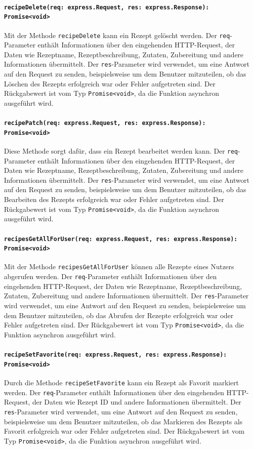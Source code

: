\documentclass{entwurfsheft}
\begin{document}
\paragraph{\texttt{recipeDelete(req: express.Request, res: express.Response): Promise<void>}}
Mit der Methode \texttt{recipeDelete} kann ein Rezept gelöscht werden. Der \texttt{req}-Parameter enthält Informationen über den eingehenden HTTP-Request, der Daten wie Rezeptname, Rezeptbeschreibung, Zutaten, Zubereitung und andere Informationen übermittelt. Der \texttt{res}-Parameter wird verwendet, um eine Antwort auf den Request zu senden, beispielsweise um dem Benutzer mitzuteilen, ob das Löschen des Rezepts erfolgreich war oder Fehler aufgetreten sind.
Der Rückgabewert ist vom Typ \texttt{Promise<void>}, da die Funktion asynchron ausgeführt wird.
\paragraph{\texttt{recipePatch(req: express.Request, res: express.Response): Promise<void>}}
Diese Methode sorgt dafür, dass ein Rezept bearbeitet werden kann. Der \texttt{req}-Parameter enthält Informationen über den eingehenden HTTP-Request, der Daten wie Rezeptname, Rezeptbeschreibung, Zutaten, Zubereitung und andere Informationen übermittelt. Der \texttt{res}-Parameter wird verwendet, um eine Antwort auf den Request zu senden, beispielsweise um dem Benutzer mitzuteilen, ob das Bearbeiten des Rezepts erfolgreich war oder Fehler aufgetreten sind.
Der Rückgabewert ist vom Typ \texttt{Promise<void>}, da die Funktion asynchron ausgeführt wird.
\paragraph{\texttt{recipesGetAllForUser(req: express.Request, res: express.Response): Promise<void>}}
Mit der Methode \texttt{recipesGetAllForUser} können alle Rezepte eines Nutzers abgerufen werden. Der \texttt{req}-Parameter enthält Informationen über den eingehenden HTTP-Request, der Daten wie Rezeptname, Rezeptbeschreibung, Zutaten, Zubereitung und andere Informationen übermittelt. Der \texttt{res}-Parameter wird verwendet, um eine Antwort auf den Request zu senden, beispielsweise um dem Benutzer mitzuteilen, ob das Abrufen der Rezepte erfolgreich war oder Fehler aufgetreten sind.
Der Rückgabewert ist vom Typ \texttt{Promise<void>}, da die Funktion asynchron ausgeführt wird.
\paragraph{\texttt{recipeSetFavorite(req: express.Request, res: express.Response): Promise<void>}}
Durch die Methode \texttt{recipeSetFavorite} kann ein Rezept als Favorit markiert werden. Der \texttt{req}-Parameter enthält Informationen über den eingehenden HTTP-Request, der Daten wie Rezept ID und andere Informationen übermittelt. Der \texttt{res}-Parameter wird verwendet, um eine Antwort auf den Request zu senden, beispielsweise um dem Benutzer mitzuteilen, ob das Markieren des Rezepts als Favorit erfolgreich war oder Fehler aufgetreten sind.
Der Rückgabewert ist vom Typ \texttt{Promise<void>}, da die Funktion asynchron ausgeführt wird.
\end{document}
